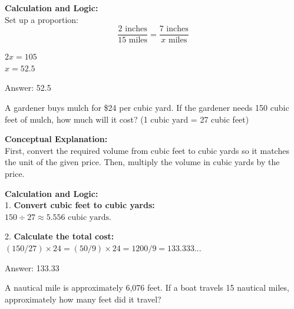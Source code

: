 \documentclass[11pt,paper=a4,answers]{exam}
\begin{document}
\begin{questions}
\begin{solution}
\textbf{Calculation and Logic:} \\
Set up a proportion: \\
\[ \frac{2 \text{ inches}}{15 \text{ miles}} = \frac{7 \text{ inches}}{x \text{ miles}} \]

\vspace{15pt}

$2x = 105$ \\
$x = 52.5$

\vspace{30pt}

Answer: \colorbox{yellow!100}{52.5}
\end{solution}

\vspace{60pt}

\question
A gardener buys mulch for \$24 per cubic yard. If the gardener needs 150 cubic feet of mulch, how much will it cost? (1 cubic yard = 27 cubic feet)

\begin{solution}
\textbf{Conceptual Explanation:} \\
First, convert the required volume from cubic feet to cubic yards so it matches the unit of the given price. Then, multiply the volume in cubic yards by the price.

\vspace{30pt}

\textbf{Calculation and Logic:} \\
1. \textbf{Convert cubic feet to cubic yards:} \\
$150 \div 27 \approx 5.556 \text{ cubic yards}$.

\vspace{15pt}

2. \textbf{Calculate the total cost:} \\
$(150/27) \times 24 = (50/9) \times 24 = 1200/9 = 133.333...$

\vspace{30pt}

Answer: \colorbox{yellow!100}{133.33}
\end{solution}

\vspace{60pt}

\question
A nautical mile is approximately 6,076 feet. If a boat travels 15 nautical miles, approximately how many feet did it travel?


\end{questions}
\end{document}
